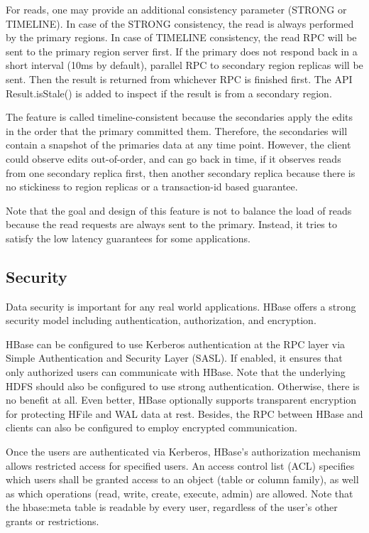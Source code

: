 \documentclass[11pt]{book}
\begin{document}
For reads, one may provide an additional consistency parameter (STRONG or TIMELINE). In case of the STRONG consistency, the read is always performed by the primary regions. In case of TIMELINE consistency, the read RPC will be sent to the primary region server first. If the primary does not respond back in a short interval (10ms by default), parallel RPC to secondary region replicas will be sent. Then the result is returned from whichever RPC is finished first. The API Result.isStale() is added to inspect if the result is from a secondary region.

The feature is called timeline-consistent because the secondaries apply the edits in the order that the primary committed them. Therefore, the secondaries will contain a snapshot of the primaries data at any time point. However, the client could observe edits out-of-order, and can go back in time, if it observes reads from one secondary replica first, then another secondary replica because there is no stickiness to region replicas or a transaction-id based guarantee.

Note that the goal and design of this feature is not to balance the load of reads because the read requests are always sent to the primary. Instead, it tries to satisfy the low latency guarantees for some applications.

\subsection{Security}
Data security is important for any real world applications. HBase offers a strong security model including authentication, authorization, and encryption.

HBase can be configured to use Kerberos authentication at the RPC layer via Simple Authentication and Security Layer (SASL). If enabled, it ensures that only authorized users can communicate with HBase. Note that the underlying HDFS should also be configured to use strong authentication. Otherwise, there is no benefit at all. Even better, HBase optionally supports transparent encryption for protecting HFile and WAL data at rest. Besides, the RPC between HBase and clients can also be configured to employ encrypted communication.

Once the users are authenticated via Kerberos, HBase's authorization mechanism allows restricted access for specified users.
An access control list (ACL) specifies which users shall be granted access to an object (table or column family), as well as which operations (read, write, create, execute, admin) are allowed. Note that the hbase:meta table is readable by every user, regardless of the user's other grants or restrictions.
\end{document}
